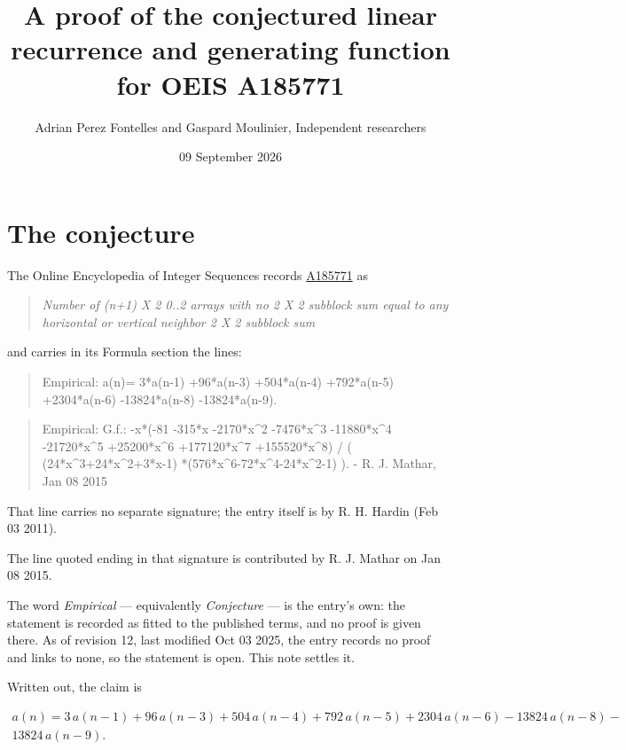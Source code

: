 \documentclass[11pt]{article}
\title{A proof of the conjectured linear recurrence and generating function for OEIS A185771}
\author{Adrian Perez Fontelles and Gaspard Moulinier, Independent researchers}
\date{09 September 2026}
\theoremstyle{definition}
\begin{document}
\maketitle
\section{The conjecture}

The Online Encyclopedia of Integer Sequences records \href{https://oeis.org/A185771}{A185771} as

\begin{quote}\itshape Number of (n+1) X 2 0..2 arrays with no 2 X 2 subblock sum equal to any horizontal or vertical neighbor 2 X 2 subblock sum\end{quote}

and carries in its Formula section the lines:

\begin{quote}\ttfamily Empirical: a(n)= 3*a(n-1) +96*a(n-3) +504*a(n-4) +792*a(n-5) +2304*a(n-6) -13824*a(n-8) -13824*a(n-9).\end{quote}

\begin{quote}\ttfamily Empirical: G.f.: -x*(-81 -315*x -2170*x\textasciicircum{}2 -7476*x\textasciicircum{}3 -11880*x\textasciicircum{}4 -21720*x\textasciicircum{}5 +25200*x\textasciicircum{}6 +177120*x\textasciicircum{}7 +155520*x\textasciicircum{}8) / ( (24*x\textasciicircum{}3+24*x\textasciicircum{}2+3*x-1) *(576*x\textasciicircum{}6-72*x\textasciicircum{}4-24*x\textasciicircum{}2-1) ). - R. J. Mathar, Jan 08 2015\end{quote}

That line carries no separate signature; the entry itself is by R. H. Hardin (Feb 03 2011).

The line quoted ending in that signature is contributed by R. J. Mathar on Jan 08 2015.

The word {\itshape Empirical} --- equivalently {\itshape Conjecture} --- is the entry's own: the statement is recorded as fitted to the published terms, and no proof is given there. As of revision 12, last modified Oct 03 2025, the entry records no proof and links to none, so the statement is open. This note settles it.

Written out, the claim is

\begin{multline*} a(n) = 3\,a(n-1) + 96\,a(n-3) + 504\,a(n-4) + 792\,a(n-5) + 2304\,a(n-6) - 13824\,a(n-8) - \\ 13824\,a(n-9). \end{multline*}
\end{document}
